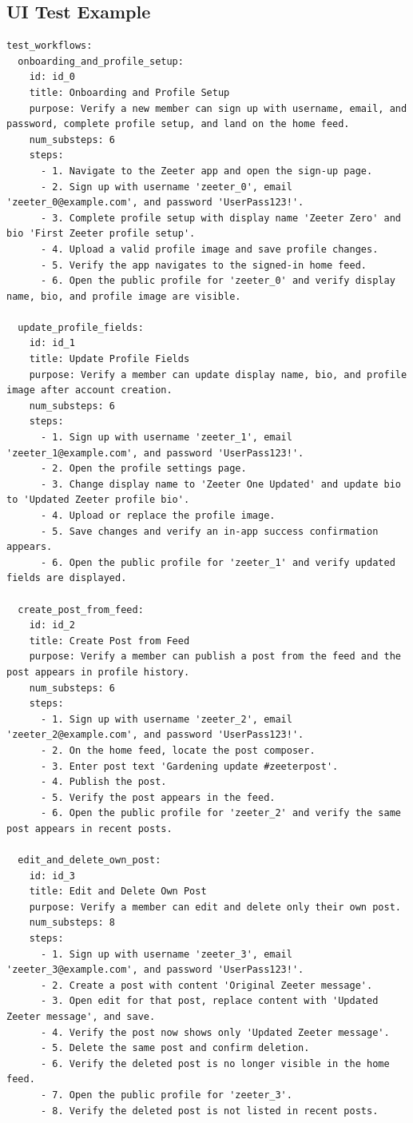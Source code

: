 \subsection{UI Test Example}
\label{sec:appendix-ui-test-example}
\begin{lstlisting}
test_workflows:
  onboarding_and_profile_setup:
    id: id_0
    title: Onboarding and Profile Setup
    purpose: Verify a new member can sign up with username, email, and password, complete profile setup, and land on the home feed.
    num_substeps: 6
    steps:
      - 1. Navigate to the Zeeter app and open the sign-up page.
      - 2. Sign up with username 'zeeter_0', email 'zeeter_0@example.com', and password 'UserPass123!'.
      - 3. Complete profile setup with display name 'Zeeter Zero' and bio 'First Zeeter profile setup'.
      - 4. Upload a valid profile image and save profile changes.
      - 5. Verify the app navigates to the signed-in home feed.
      - 6. Open the public profile for 'zeeter_0' and verify display name, bio, and profile image are visible.

  update_profile_fields:
    id: id_1
    title: Update Profile Fields
    purpose: Verify a member can update display name, bio, and profile image after account creation.
    num_substeps: 6
    steps:
      - 1. Sign up with username 'zeeter_1', email 'zeeter_1@example.com', and password 'UserPass123!'.
      - 2. Open the profile settings page.
      - 3. Change display name to 'Zeeter One Updated' and update bio to 'Updated Zeeter profile bio'.
      - 4. Upload or replace the profile image.
      - 5. Save changes and verify an in-app success confirmation appears.
      - 6. Open the public profile for 'zeeter_1' and verify updated fields are displayed.

  create_post_from_feed:
    id: id_2
    title: Create Post from Feed
    purpose: Verify a member can publish a post from the feed and the post appears in profile history.
    num_substeps: 6
    steps:
      - 1. Sign up with username 'zeeter_2', email 'zeeter_2@example.com', and password 'UserPass123!'.
      - 2. On the home feed, locate the post composer.
      - 3. Enter post text 'Gardening update #zeeterpost'.
      - 4. Publish the post.
      - 5. Verify the post appears in the feed.
      - 6. Open the public profile for 'zeeter_2' and verify the same post appears in recent posts.

  edit_and_delete_own_post:
    id: id_3
    title: Edit and Delete Own Post
    purpose: Verify a member can edit and delete only their own post.
    num_substeps: 8
    steps:
      - 1. Sign up with username 'zeeter_3', email 'zeeter_3@example.com', and password 'UserPass123!'.
      - 2. Create a post with content 'Original Zeeter message'.
      - 3. Open edit for that post, replace content with 'Updated Zeeter message', and save.
      - 4. Verify the post now shows only 'Updated Zeeter message'.
      - 5. Delete the same post and confirm deletion.
      - 6. Verify the deleted post is no longer visible in the home feed.
      - 7. Open the public profile for 'zeeter_3'.
      - 8. Verify the deleted post is not listed in recent posts.


\end{lstlisting}
